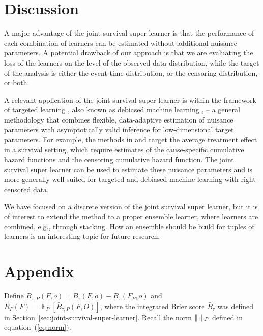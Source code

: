 \documentclass[alpha-refs]{wiley-article}
\DeclareMathOperator{\E}{\mathbb{E}} %
\newcommand{\blank}{\makebox[1ex]{\textbf{$\cdot$}}}
\newcommand{\1}{\mathds{1}}
\begin{document}
\section{Discussion}
\label{sec:discussion}

A major advantage of the joint survival super learner is that the
performance of each combination of learners can be estimated without
additional nuisance parameters. A potential drawback of our approach
is that we are evaluating the loss of the learners on the level of the
observed data distribution, while the target of the analysis is either
the event-time distribution, or the censoring distribution, or both.

A relevant application of the joint survival super learner is within
the framework of targeted learning \citep{van2011targeted}, also known
as debiased machine learning \citep{chernozhukov2018double}, -- a
general methodology that combines flexible, data-adaptive estimation
of nuisance parameters with asymptotically valid inference for
low-dimensional target parameters.  For example, the methods in
\cite{van2003unified} and \cite{rytgaard2022targeted} target the
average treatment effect in a survival setting, which require
estimates of the cause-specific cumulative hazard functions and the
censoring cumulative hazard function. The joint survival super learner
can be used to estimate these nuisance parameters and is more
generally well suited for targeted and debiased machine learning with
right-censored data.

We have focused on a discrete version of the joint survival super
learner, but it is of interest to extend the method to a proper
ensemble learner, where learners are combined, e.g., through
stacking. How an ensemble should be build for tuples of learners is an
interesting topic for future research.

\appendix

\section*{Appendix}


Define
\( \bar{B}_{\tau,P}(F, o) = \bar{B}_{\tau}(F, o) -
\bar{B}_{\tau}(F_P, o) \) and
\( R_{P}(F) = \E_P{[\bar{B}_{\tau,P}(F, O)]} \), where the
integrated Brier score \( \bar{B}_{\tau} \) was defined in
Section~\ref{sec:joint-survival-super-learner}. Recall the norm
\( \Vert \blank \Vert_{P}\) defined in
equation~(\ref{eq:norm}).
\end{document}
